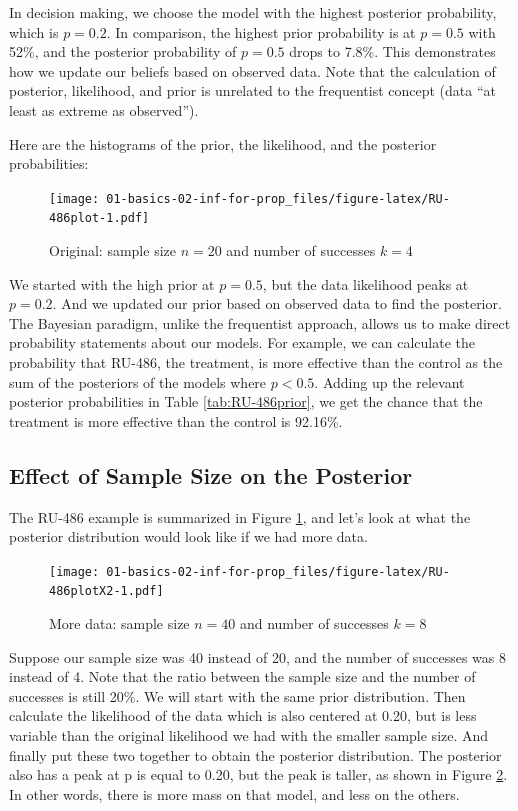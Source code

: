 \documentclass[]{book}
\theoremstyle{definition}
\theoremstyle{definition}
\theoremstyle{definition}
\theoremstyle{remark}
\begin{document}
In decision making, we choose the model with the highest posterior
probability, which is \(p=0.2\). In comparison, the highest prior
probability is at \(p=0.5\) with 52\%, and the posterior probability of
\(p=0.5\) drops to 7.8\%. This demonstrates how we update our beliefs
based on observed data. Note that the calculation of posterior,
likelihood, and prior is unrelated to the frequentist concept (data ``at
least as extreme as observed'').

Here are the histograms of the prior, the likelihood, and the posterior
probabilities:

\begin{figure}
\centering
\texttt{[image: 01-basics-02-inf-for-prop\_files/figure-latex/RU-486plot-1.pdf]}
\caption{\label{fig:RU-486plot}Original: sample size \(n=20\) and number of
successes \(k=4\)}
\end{figure}

We started with the high prior at \(p=0.5\), but the data likelihood
peaks at \(p=0.2\). And we updated our prior based on observed data to
find the posterior. The Bayesian paradigm, unlike the frequentist
approach, allows us to make direct probability statements about our
models. For example, we can calculate the probability that RU-486, the
treatment, is more effective than the control as the sum of the
posteriors of the models where \(p<0.5\). Adding up the relevant
posterior probabilities in Table \ref{tab:RU-486prior}, we get the
chance that the treatment is more effective than the control is 92.16\%.

\subsection{Effect of Sample Size on the
Posterior}\label{effect-of-sample-size-on-the-posterior}

The RU-486 example is summarized in Figure \ref{fig:RU-486plot}, and
let's look at what the posterior distribution would look like if we had
more data.

\begin{figure}
\centering
\texttt{[image: 01-basics-02-inf-for-prop\_files/figure-latex/RU-486plotX2-1.pdf]}
\caption{\label{fig:RU-486plotX2}More data: sample size \(n=40\) and number
of successes \(k=8\)}
\end{figure}

Suppose our sample size was 40 instead of 20, and the number of
successes was 8 instead of 4. Note that the ratio between the sample
size and the number of successes is still 20\%. We will start with the
same prior distribution. Then calculate the likelihood of the data which
is also centered at 0.20, but is less variable than the original
likelihood we had with the smaller sample size. And finally put these
two together to obtain the posterior distribution. The posterior also
has a peak at p is equal to 0.20, but the peak is taller, as shown in
Figure \ref{fig:RU-486plotX2}. In other words, there is more mass on
that model, and less on the others.
\end{document}
